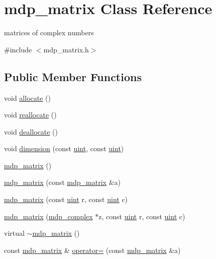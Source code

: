 \hypertarget{classmdp__matrix}{
\section{mdp\_\-matrix Class Reference}
\label{classmdp__matrix}
}


matrices of complex numbers  


{\ttfamily \#include $<$mdp\_\-matrix.h$>$}\subsection*{Public Member Functions}
\begin{DoxyCompactItemize}
\item 
void \hyperlink{classmdp__matrix_a1a9cef75d472f8e7ab0665de46321030}{allocate} ()
\item 
void \hyperlink{classmdp__matrix_aae11eac9a3c0f2c0cc05450a67924cda}{reallocate} ()
\item 
void \hyperlink{classmdp__matrix_a37512f689166e890038ec9688d3a171e}{deallocate} ()
\item 
void \hyperlink{classmdp__matrix_a980d0f0a42bb19ba9135a0bf97d85c76}{dimension} (const \hyperlink{mdp__global__vars_8h_a91ad9478d81a7aaf2593e8d9c3d06a14}{uint}, const \hyperlink{mdp__global__vars_8h_a91ad9478d81a7aaf2593e8d9c3d06a14}{uint})
\item 
\hyperlink{classmdp__matrix_a54b72b2aaf4630fce237604942cf6b3d}{mdp\_\-matrix} ()
\item 
\hyperlink{classmdp__matrix_a8f70e8e0ad282c3f9c83ff0550eda677}{mdp\_\-matrix} (const \hyperlink{classmdp__matrix}{mdp\_\-matrix} \&a)
\item 
\hyperlink{classmdp__matrix_a943b6d355ac862b8592648275ba1639f}{mdp\_\-matrix} (const \hyperlink{mdp__global__vars_8h_a91ad9478d81a7aaf2593e8d9c3d06a14}{uint} r, const \hyperlink{mdp__global__vars_8h_a91ad9478d81a7aaf2593e8d9c3d06a14}{uint} c)
\item 
\hyperlink{classmdp__matrix_a743bde7a120b947e065c8fd7b658b163}{mdp\_\-matrix} (\hyperlink{classmdp__complex}{mdp\_\-complex} $\ast$z, const \hyperlink{mdp__global__vars_8h_a91ad9478d81a7aaf2593e8d9c3d06a14}{uint} r, const \hyperlink{mdp__global__vars_8h_a91ad9478d81a7aaf2593e8d9c3d06a14}{uint} c)
\item 
virtual \hyperlink{classmdp__matrix_a5c20b7431f6da6f54c381331f8a09c44}{$\sim$mdp\_\-matrix} ()
\item 
const \hyperlink{classmdp__matrix}{mdp\_\-matrix} \& \hyperlink{classmdp__matrix_a5746a4a6feeaca44c8c9a02bd21e9d57}{operator=} (const \hyperlink{classmdp__matrix}{mdp\_\-matrix} \&a)

\end{DoxyCompactItemize}
